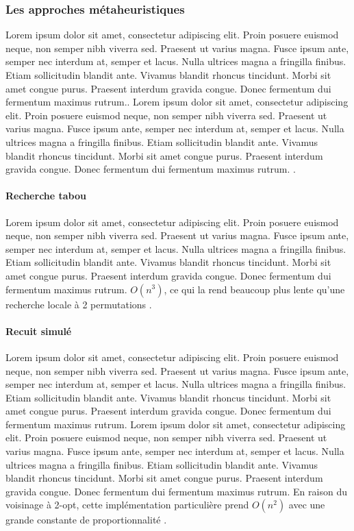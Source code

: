 \subsubsection{Les approches métaheuristiques}
Lorem ipsum dolor sit amet, consectetur adipiscing elit. Proin posuere euismod neque, non semper nibh viverra sed. Praesent ut varius magna. Fusce ipsum ante, semper nec interdum at, semper et lacus. Nulla ultrices magna a fringilla finibus. Etiam sollicitudin blandit ante. Vivamus blandit rhoncus tincidunt. Morbi sit amet congue purus. Praesent interdum gravida congue. Donec fermentum dui fermentum maximus rutrum.\parencite{blum_metaheuristics_2003}. Lorem ipsum dolor sit amet, consectetur adipiscing elit. Proin posuere euismod neque, non semper nibh viverra sed. Praesent ut varius magna. Fusce ipsum ante, semper nec interdum at, semper et lacus. Nulla ultrices magna a fringilla finibus. Etiam sollicitudin blandit ante. Vivamus blandit rhoncus tincidunt. Morbi sit amet congue purus. Praesent interdum gravida congue. Donec fermentum dui fermentum maximus rutrum. \parencite{bianchi_survey_2009}.

\medskip

\paragraph{Recherche tabou}
Lorem ipsum dolor sit amet, consectetur adipiscing elit. Proin posuere euismod neque, non semper nibh viverra sed. Praesent ut varius magna. Fusce ipsum ante, semper nec interdum at, semper et lacus. Nulla ultrices magna a fringilla finibus. Etiam sollicitudin blandit ante. Vivamus blandit rhoncus tincidunt. Morbi sit amet congue purus. Praesent interdum gravida congue. Donec fermentum dui fermentum maximus rutrum. $O(n^3)$, ce qui la rend beaucoup plus lente qu'une recherche locale à 2 permutations \parencite{davendra_traveling_2010}.

\medskip

\paragraph{Recuit simulé}
Lorem ipsum dolor sit amet, consectetur adipiscing elit. Proin posuere euismod neque, non semper nibh viverra sed. Praesent ut varius magna. Fusce ipsum ante, semper nec interdum at, semper et lacus. Nulla ultrices magna a fringilla finibus. Etiam sollicitudin blandit ante. Vivamus blandit rhoncus tincidunt. Morbi sit amet congue purus. Praesent interdum gravida congue. Donec fermentum dui fermentum maximus rutrum. \parencite{johnson_traveling_1995} Lorem ipsum dolor sit amet, consectetur adipiscing elit. Proin posuere euismod neque, non semper nibh viverra sed. Praesent ut varius magna. Fusce ipsum ante, semper nec interdum at, semper et lacus. Nulla ultrices magna a fringilla finibus. Etiam sollicitudin blandit ante. Vivamus blandit rhoncus tincidunt. Morbi sit amet congue purus. Praesent interdum gravida congue. Donec fermentum dui fermentum maximus rutrum. En raison du voisinage à 2-opt, cette implémentation particulière prend $O(n^2)$ avec une grande constante de proportionnalité \parencite{davendra_traveling_2010}.

